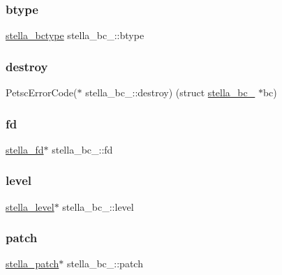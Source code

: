 \subsubsection{\texorpdfstring{btype}{btype}}
{\footnotesize\ttfamily \mbox{\hyperlink{stella__bc_8h_a7959afa0ee9aae02dd31cfce273269ce}{stella\+\_\+bctype}} stella\+\_\+bc\+\_\+\+::btype}

\mbox{\label{structstella__bc___a4557b392d86abf64d786ed0b7f98c064}} 
\subsubsection{\texorpdfstring{destroy}{destroy}}
{\footnotesize\ttfamily Petsc\+Error\+Code($\ast$ stella\+\_\+bc\+\_\+\+::destroy) (struct \mbox{\hyperlink{structstella__bc__}{stella\+\_\+bc\+\_\+}} $\ast$bc)}

\mbox{\label{structstella__bc___a5278ffab5eefeb6a31f20b8a9d5c5459}} 
\subsubsection{\texorpdfstring{fd}{fd}}
{\footnotesize\ttfamily \mbox{\hyperlink{structstella__fd}{stella\+\_\+fd}}$\ast$ stella\+\_\+bc\+\_\+\+::fd}

\mbox{\label{structstella__bc___aedec7c12ca10923dce08b29326b46196}} 
\subsubsection{\texorpdfstring{level}{level}}
{\footnotesize\ttfamily \mbox{\hyperlink{structstella__level}{stella\+\_\+level}}$\ast$ stella\+\_\+bc\+\_\+\+::level}

\mbox{\label{structstella__bc___a1c120954411b9713b927063f41277a80}} 
\subsubsection{\texorpdfstring{patch}{patch}}
{\footnotesize\ttfamily \mbox{\hyperlink{structstella__patch}{stella\+\_\+patch}}$\ast$ stella\+\_\+bc\+\_\+\+::patch}

